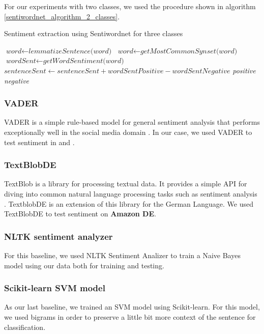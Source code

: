 For our experiments with two classes, we used the procedure shown in algorithm \ref{sentiwordnet_algorithm_2_classes}.
\begin{algorithm}[h]
\caption{Sentiment extraction using Sentiwordnet for three classes}\label{euclid}
\label{sentiwordnet_algorithm_2_classes}
\begin{algorithmic}[1]
\State $\textit{word} \gets \textit{lemmatizeSentence(word)}$
\State $\textit{word} \gets \textit{getMostCommonSynset(word)}$
\State $\textit{wordSent} \gets \textit{getWordSentiment(word)}$
\State $\textit{sentenceSent} \gets \textit{sentenceSent} + \textit{wordSentPositive} - \textit{wordSentNegative}$
\EndFor
{}
    \Return \textit{positive}
\Else
    \Return \textit{negative}
\EndIf
\EndProcedure
\end{algorithmic}
\end{algorithm}
\subsubsection{VADER}
VADER is a simple rule-based model for general sentiment  analysis that performs  exceptionally well  in  the  social  media  domain \cite{VADERarticle}.
In our case, we used VADER to test sentiment in {\dataEN} and {\dataORG}.
\subsubsection{TextBlobDE}
TextBlob is a library for processing textual data. It provides a simple API for diving into common natural language processing tasks such as sentiment analysis \cite{textblob}. TextblobDE is an extension of this library for the German Language. We used TextBlobDE to test sentiment on {\bf Amazon DE}.
\subsubsection{NLTK sentiment analyzer}
For this baseline, we used NLTK Sentiment Analizer to train a Naive Bayes model using our data both for training and testing.
\subsubsection{Scikit-learn SVM model}
As our last baseline, we trained an SVM model using Scikit-learn. For this model, we used bigrams in order to preserve a little bit more context of the sentence for classification.
